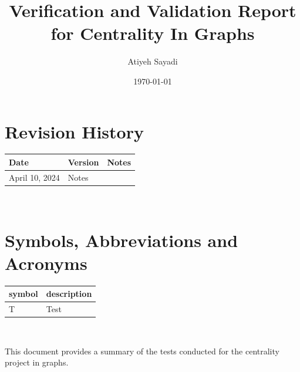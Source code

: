 \documentclass[12pt, titlepage]{article}
\begin{document}
\title{Verification and Validation Report for Centrality In Graphs} 
\author{Atiyeh Sayadi}
\date{\today}
	
\maketitle


\section{Revision History}

\begin{tabularx}{\textwidth}{p{3cm}p{2cm}X}
\toprule {\bf Date} & {\bf Version} & {\bf Notes}\\
\midrule
April 10, 2024 & Notes\\
\bottomrule
\end{tabularx}

~\newpage

\section{Symbols, Abbreviations and Acronyms}

\renewcommand{\arraystretch}{1.2}
\begin{tabular}{l l} 
  \toprule		
  \textbf{symbol} & \textbf{description}\\
  \midrule 
  T & Test\\
  \bottomrule
\end{tabular}\\



\newpage

\tableofcontents

\listoftables %

\listoffigures %

\newpage



This document provides a summary of the tests conducted for the centrality project in graphs.
\end{document}
